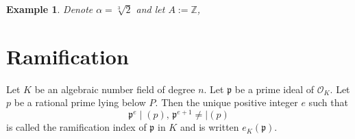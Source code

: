 \documentclass[a4paper]{book}
\theoremstyle{break}
\newtheorem{example}{Example}
\theoremstyle{plain}
\begin{document}
\begin{example}
    Denote \(\alpha = \sqrt[3]{2}\) and let \(A := \mathbb{Z}\), 
\end{example}

\newpage

\section{Ramification}

\begin{definition}
    Let \(K\) be an algebraic number field of degree \(n\). Let \(\mathfrak{p}\) be a prime ideal of \(\mathcal{O}_K\). Let \(p\) be a rational prime lying below \(P\). Then the unique positive integer \(e\) such that
    \begin{equation}
        \mathfrak{p}^e \mid (p), \, \mathfrak{p}^{e + 1} \neq\mid (p)
    \end{equation}
    is called the ramification index of \(\mathfrak{p}\) in \(K\) and is written \(e_K(\mathfrak{p})\).
\end{definition}
\end{document}
